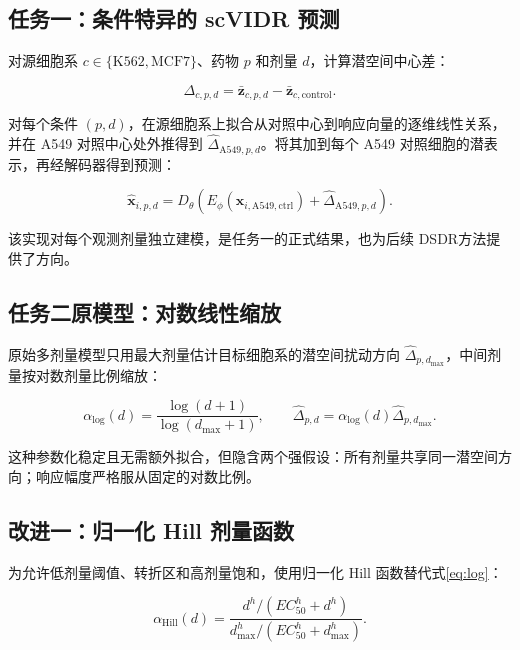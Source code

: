 \documentclass[UTF8,11pt,a4paper,fontset=fandol]{ctexart}
\newcommand{\dsdr}{\textsc{DSDR}}
\begin{document}
\subsection{任务一：条件特异的 scVIDR 预测}

对源细胞系 $c\in\{\mathrm{K562},\mathrm{MCF7}\}$、药物 $p$ 和剂量 $d$，计算潜空间中心差：

\begin{equation}
\Delta_{c,p,d}=\bar{\bm{z}}_{c,p,d}-\bar{\bm{z}}_{c,\mathrm{control}}.
\end{equation}

对每个条件 $(p,d)$，在源细胞系上拟合从对照中心到响应向量的逐维线性关系，并在 A549 对照中心处外推得到 $\widehat{\Delta}_{\mathrm{A549},p,d}$。将其加到每个 A549 对照细胞的潜表示，再经解码器得到预测：

\begin{equation}
\hat{\bm{x}}_{i,p,d}=D_{\theta}\!\left(E_{\phi}(\bm{x}_{i,\mathrm{A549,ctrl}})
+\widehat{\Delta}_{\mathrm{A549},p,d}\right).
\end{equation}

该实现对每个观测剂量独立建模，是任务一的正式结果，也为后续 \dsdr 方法提供了方向。

\subsection{任务二原模型：对数线性缩放}

原始多剂量模型只用最大剂量估计目标细胞系的潜空间扰动方向 $\widehat{\Delta}_{p,d_{\max}}$，中间剂量按对数剂量比例缩放：

\begin{equation}
\alpha_{\log}(d)=\frac{\log(d+1)}{\log(d_{\max}+1)},\qquad
\widehat{\Delta}_{p,d}=\alpha_{\log}(d)\widehat{\Delta}_{p,d_{\max}}.
\label{eq:log}
\end{equation}

这种参数化稳定且无需额外拟合，但隐含两个强假设：所有剂量共享同一潜空间方向；响应幅度严格服从固定的对数比例。

\subsection{改进一：归一化 Hill 剂量函数}

为允许低剂量阈值、转折区和高剂量饱和，使用归一化 Hill 函数替代式\eqref{eq:log}：

\begin{equation}
\alpha_{\mathrm{Hill}}(d)=
\frac{d^h/(EC_{50}^h+d^h)}
{d_{\max}^h/(EC_{50}^h+d_{\max}^h)}.
\end{equation}
\end{document}
